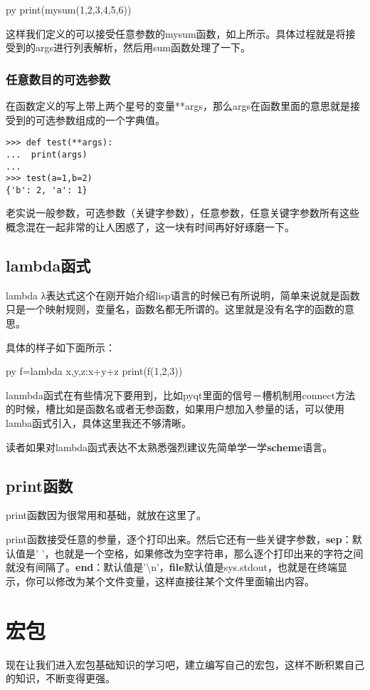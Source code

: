 \documentclass[12pt,oneside]{book}
\begin{document}
\begin{common-format}
\begin{xverbatim}[129]{py}
print(mysum(1,2,3,4,5,6))
\end{xverbatim}
这样我们定义的可以接受任意参数的mysum函数，如上所示。具体过程就是将接受到的args进行列表解析，然后用sum函数处理了一下。


\subsection{任意数目的可选参数}
在函数定义的写上带上两个星号的变量**args，那么args在函数里面的意思就是接受到的可选参数组成的一个字典值。
\begin{Verbatim}
>>> def test(**args):
...  print(args)
... 
>>> test(a=1,b=2)
{'b': 2, 'a': 1}
\end{Verbatim}

老实说一般参数，可选参数（关键字参数），任意参数，任意关键字参数所有这些概念混在一起非常的让人困惑了，这一块有时间再好好琢磨一下。


\section{lambda函式}
lambda
λ表达式这个在刚开始介绍lisp语言的时候已有所说明，简单来说就是函数只是一个映射规则，变量名，函数名都无所谓的。这里就是没有名字的函数的意思。

具体的样子如下面所示：
\begin{xverbatim}[129]{py}
f=lambda x,y,z:x+y+z
print(f(1,2,3))
\end{xverbatim}

lanmbda函式在有些情况下要用到，比如pyqt里面的信号－槽机制用connect方法的时候，槽比如是函数名或者无参函数，如果用户想加入参量的话，可以使用lamba函式引入，具体这里我还不够清晰。

读者如果对lambda函式表达不太熟悉强烈建议先简单学一学\textbf{scheme}语言。

\section{print函数}
print函数因为很常用和基础，就放在这里了。

print函数接受任意的参量，逐个打印出来。然后它还有一些关键字参数，\textbf{sep}：默认值是' '，也就是一个空格，如果修改为空字符串，那么逐个打印出来的字符之间就没有间隔了。\textbf{end}：默认值是'\textbackslash{}n'，\textbf{file}默认值是sys.stdout，也就是在终端显示，你可以修改为某个文件变量，这样直接往某个文件里面输出内容。



\chapter{宏包}
现在让我们进入宏包基础知识的学习吧，建立编写自己的宏包，这样不断积累自己的知识，不断变得更强。


\end{common-format}
\end{document}
